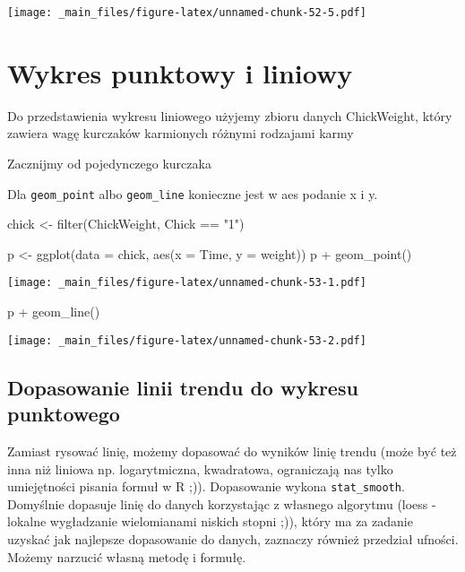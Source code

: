 \documentclass[
]{book}
\newenvironment{Shaded}{\begin{snugshade}}{\end{snugshade}}
\newcommand{\AttributeTok}[1]{\textcolor[rgb]{0.77,0.63,0.00}{#1}}
\newcommand{\FunctionTok}[1]{\textcolor[rgb]{0.00,0.00,0.00}{#1}}
\newcommand{\NormalTok}[1]{#1}
\newcommand{\OtherTok}[1]{\textcolor[rgb]{0.56,0.35,0.01}{#1}}
\newcommand{\SpecialCharTok}[1]{\textcolor[rgb]{0.00,0.00,0.00}{#1}}
\newcommand{\StringTok}[1]{\textcolor[rgb]{0.31,0.60,0.02}{#1}}
\begin{document}
\texttt{[image: \_main\_files/figure-latex/unnamed-chunk-52-5.pdf]}

\hypertarget{wykres-punktowy-i-liniowy}{%
\section{Wykres punktowy i liniowy}\label{wykres-punktowy-i-liniowy}}

Do przedstawienia wykresu liniowego użyjemy zbioru danych ChickWeight, który zawiera wagę kurczaków karmionych różnymi rodzajami karmy

Zacznijmy od pojedynczego kurczaka

Dla \texttt{geom\_point} albo \texttt{geom\_line} konieczne jest w aes podanie x i y.

\begin{Shaded}
\begin{Highlighting}[]
\NormalTok{chick }\OtherTok{\textless{}{-}} \FunctionTok{filter}\NormalTok{(ChickWeight, Chick }\SpecialCharTok{==} \StringTok{"1"}\NormalTok{)}

\NormalTok{p }\OtherTok{\textless{}{-}} \FunctionTok{ggplot}\NormalTok{(}\AttributeTok{data =}\NormalTok{ chick, }\FunctionTok{aes}\NormalTok{(}\AttributeTok{x =}\NormalTok{ Time, }\AttributeTok{y =}\NormalTok{ weight))}
\NormalTok{p }\SpecialCharTok{+} \FunctionTok{geom\_point}\NormalTok{()}
\end{Highlighting}
\end{Shaded}

\texttt{[image: \_main\_files/figure-latex/unnamed-chunk-53-1.pdf]}

\begin{Shaded}
\begin{Highlighting}[]
\NormalTok{p }\SpecialCharTok{+} \FunctionTok{geom\_line}\NormalTok{()}
\end{Highlighting}
\end{Shaded}

\texttt{[image: \_main\_files/figure-latex/unnamed-chunk-53-2.pdf]}

\hypertarget{dopasowanie-linii-trendu-do-wykresu-punktowego}{%
\subsection{Dopasowanie linii trendu do wykresu punktowego}\label{dopasowanie-linii-trendu-do-wykresu-punktowego}}

Zamiast rysować linię, możemy dopasować do wyników linię trendu (może być też inna niż liniowa np. logarytmiczna, kwadratowa, ograniczają nas tylko umiejętności pisania formuł w R ;)). Dopasowanie wykona \texttt{stat\_smooth}. Domyślnie dopasuje linię do danych korzystając z własnego algorytmu (loess - lokalne wygładzanie wielomianami niskich stopni ;)), który ma za zadanie uzyskać jak najlepsze dopasowanie do danych, zaznaczy również przedział ufności. Możemy narzucić własną metodę i formułę.
\end{document}

